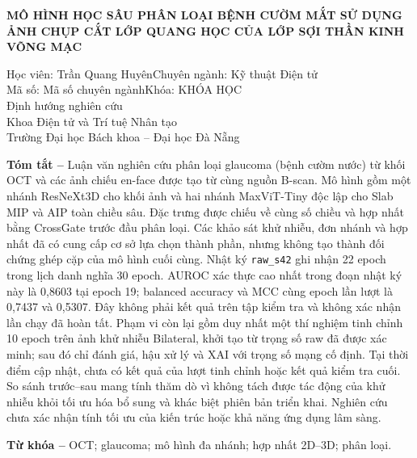 \documentclass[14pt,a4paper,oneside]{extreport}
\newcommand{\KhoaDaoTao}{Khoa Điện tử và Trí tuệ Nhân tạo}
\newcommand{\KhoaHoc}{KHÓA HỌC}
\newcommand{\TacGia}{Trần Quang Huyên}
\newcommand{\TenDeTai}{Mô hình học sâu phân loại bệnh cườm mắt sử dụng ảnh chụp cắt lớp quang học của lớp sợi thần kinh võng mạc}
\newcommand{\ChuyenNganh}{Kỹ thuật Điện tử}
\newcommand{\DinhHuongDaoTao}{Định hướng nghiên cứu}
\newcommand{\MaSo}{Mã số chuyên ngành}
\begin{document}
\clearpage
{}
{}
\begingroup
{}
\fontsize{11pt}{13.2pt}\selectfont
\setlength{\parindent}{0pt}
\setlength{\parskip}{5pt}
\begin{center}
  {\fontsize{13pt}{15.6pt}\selectfont\bfseries\MakeUppercase{\TenDeTai}\par}
  \vspace{5pt}
  Học viên: \TacGia\quad Chuyên ngành: \ChuyenNganh\\
  Mã số: \MaSo\quad Khóa: \KhoaHoc\\
  \DinhHuongDaoTao\\
  \KhoaDaoTao\\
  Trường Đại học Bách khoa -- Đại học Đà Nẵng
\end{center}
\textbf{Tóm tắt --}
Luận văn nghiên cứu phân loại glaucoma (bệnh cườm nước) từ khối OCT
và các ảnh chiếu en-face được tạo từ cùng nguồn B-scan. Mô hình gồm
một nhánh ResNeXt3D cho khối ảnh và hai nhánh MaxViT-Tiny độc lập cho
Slab MIP và AIP toàn chiều sâu. Đặc trưng được chiếu về cùng số chiều
và hợp nhất bằng CrossGate trước đầu phân loại. Các khảo sát khử nhiễu,
đơn nhánh và hợp nhất đã có cung cấp cơ sở lựa chọn thành phần, nhưng
không tạo thành đối chứng ghép cặp của mô hình cuối cùng. Nhật ký
\texttt{raw\_s42} ghi nhận 22 epoch trong lịch danh nghĩa 30 epoch.
AUROC xác thực cao nhất trong đoạn nhật ký này là 0,8603 tại epoch 19;
balanced accuracy và MCC cùng epoch lần lượt là 0,7437 và 0,5307.
Đây không phải kết quả trên tập kiểm tra và không xác nhận lần chạy
đã hoàn tất. Phạm vi còn lại gồm duy nhất một thí nghiệm tinh chỉnh
10 epoch trên ảnh khử nhiễu Bilateral, khởi tạo từ trọng số raw đã
được xác minh; sau đó chỉ đánh giá, hậu xử lý và XAI với trọng số mạng
cố định. Tại thời điểm cập nhật, chưa có kết quả của lượt tinh chỉnh
hoặc kết quả kiểm tra cuối. So sánh trước--sau mang tính thăm dò vì
không tách được tác động của khử nhiễu khỏi tối ưu hóa bổ sung và
khác biệt phiên bản triển khai. Nghiên cứu chưa xác nhận tính tối ưu
của kiến trúc hoặc khả năng ứng dụng lâm sàng.

\textbf{Từ khóa --} OCT; glaucoma; mô hình đa nhánh; hợp nhất 2D--3D; phân loại.
\end{document}
